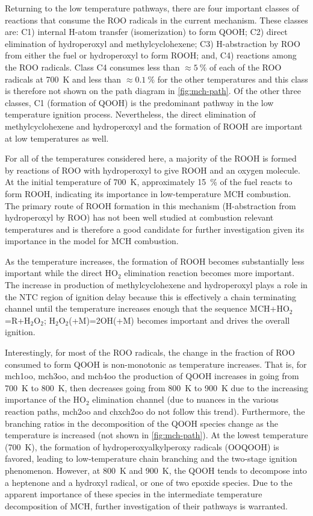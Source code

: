 \documentclass[../main.tex]{subfiles}
\begin{document}
Returning to the low temperature pathways, there are four important classes of
reactions that consume the ROO radicals in the current mechanism. These classes
are: C1) internal H-atom transfer (isomerization) to form QOOH; C2) direct
elimination of hydroperoxyl and methylcyclohexene; C3) H-abstraction by ROO
from either the fuel or hydroperoxyl to form ROOH; and, C4) reactions among the
ROO radicals. Class C4 consumes less than $\approx\SI{5}{\percent}$ of each of the ROO radicals at
\SI{700}{\kelvin} and less than $\approx\SI{0.1}{\percent}$ for the other temperatures and this class is
therefore not shown on the path diagram in \cref{fig:mch-path}. Of the other
three classes, C1 (formation of QOOH) is the predominant pathway in the low
temperature ignition process. Nevertheless, the direct elimination of
methylcyclohexene and hydroperoxyl and the formation of ROOH are important at
low temperatures as well.

For all of the temperatures considered here, a majority of the ROOH is formed
by reactions of ROO with hydroperoxyl to give ROOH and an oxygen molecule. At
the initial temperature of \SI{700}{\kelvin}, approximately \SI{15}{\percent} of the fuel reacts to form
ROOH, indicating its importance in low-temperature MCH combustion. The primary
route of ROOH formation in this mechanism (H-abstraction from hydroperoxyl by
ROO) has not been well studied at combustion relevant temperatures
\cite{Zador2011} and is therefore a good candidate for further investigation
given its importance in the model for MCH combustion.

As the temperature increases, the formation of ROOH becomes substantially less
important while the direct HO$_2$ elimination reaction becomes more important.
The increase in production of methylcyclohexene and hydroperoxyl plays a role
in the NTC region of ignition delay because this is effectively a chain
terminating channel until the temperature increases enough that the sequence
MCH+HO$_2$=R+H$_2$O$_2$; H$_2$O$_2$(+M)=2OH(+M) becomes important and drives
the overall ignition.

Interestingly, for most of the ROO radicals, the change in the fraction of ROO
consumed to form QOOH is non-monotonic as temperature increases. That is, for
mch1oo, mch3oo, and mch4oo the production of QOOH increases in going from \SI{700}{\kelvin}
to \SI{800}{\kelvin}, then decreases going from \SI{800}{\kelvin} to \SI{900}{\kelvin} due to the increasing
importance of the HO$_2$ elimination channel (due to nuances in the various
reaction paths, mch2oo and chxch2oo do not follow this trend). Furthermore,
the branching ratios in the decomposition of the QOOH species change as the
temperature is increased (not shown in \cref{fig:mch-path}). At the lowest
temperature (\SI{700}{\kelvin}), the formation of hydroperoxyalkylperoxy radicals (OOQOOH)
is favored, leading to low-temperature chain branching and the two-stage
ignition phenomenon. However, at \SI{800}{\kelvin} and \SI{900}{\kelvin}, the QOOH tends to decompose
into a heptenone and a hydroxyl radical, or one of two epoxide species. Due to
the apparent importance of these species in the intermediate temperature
decomposition of MCH, further investigation of their pathways is warranted.
\end{document}
